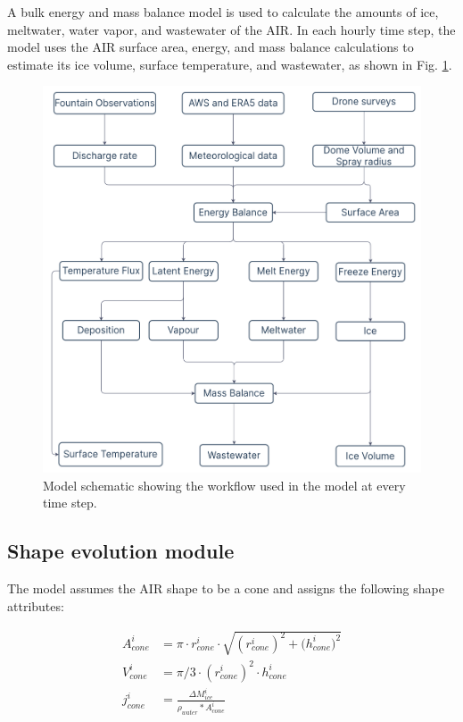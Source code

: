 A bulk energy and mass balance model is used to calculate the amounts of ice, meltwater, water vapor, and
wastewater of the \ac{AIR}. In each hourly time step, the model uses the \ac{AIR} surface area, energy, and mass balance
calculations to estimate its ice volume, surface temperature, and wastewater, as shown in Fig. \ref{fig:schema}.

\begin{figure}
	\begin{center}
		\includegraphics[width=10 cm]{figs/model_schematic.jpg}
	\end{center}
	\caption{Model schematic showing the workflow used in the model at every time step. }
	\label{fig:schema}
\end{figure}

\subsection{Shape evolution module} \label{sec:shape}

The model assumes the \ac{AIR} shape to be a cone and assigns the following shape attributes:

\begin{subequations}
	\begin{align}
		\label{eq:A}
		A_{cone}^i & = \pi \cdot r_{cone}^i \cdot \sqrt{{(r_{cone}^i)}^2 + {(h_{cone}^i})^ 2} \\
		\label{eq:V}
		V_{cone}^i & = \pi/3 \cdot {(r_{cone}^i)}^2 \cdot h_{cone}^i                          \\
		\label{eq:thickness}
		j_{cone}^i & =\frac{\Delta M_{ice}^i}{\rho_{water}* A_{cone}^i}
	\end{align}
\end{subequations}


